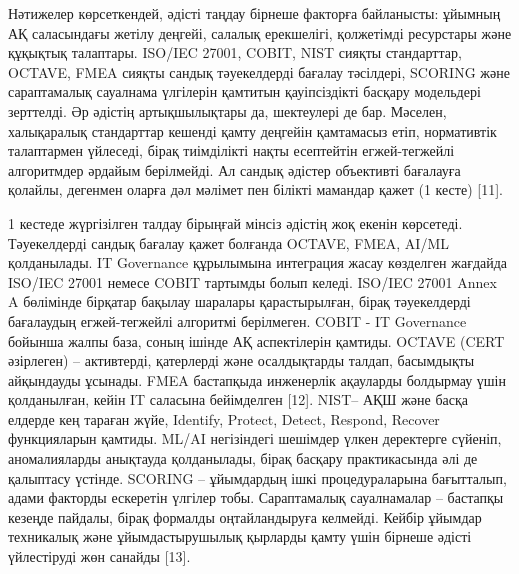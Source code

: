 \begin{multicols}{2}
Нәтижелер көрсеткендей, әдісті таңдау бірнеше факторға байланысты:
ұйымның АҚ саласындағы жетілу деңгейі, салалық ерекшелігі, қолжетімді
ресурстары және құқықтық талаптары. ISO/IEC 27001, COBIT, NIST сияқты
стандарттар, OCTAVE, FMEA сияқты сандық тәуекелдерді бағалау тәсілдері,
SCORING және сараптамалық сауалнама үлгілерін қамтитын қауіпсіздікті
басқару модельдері зерттелді. Әр әдістің артықшылықтары да, шектеулері
де бар. Мәселен, халықаралық стандарттар кешенді қамту деңгейін
қамтамасыз етіп, нормативтік талаптармен үйлеседі, бірақ тиімділікті
нақты есептейтін егжей-тегжейлі алгоритмдер әрдайым берілмейді. Ал
сандық әдістер объективті бағалауға қолайлы, дегенмен оларға дәл мәлімет
пен білікті мамандар қажет (1 кесте) {[}11{]}.

1 кестеде жүргізілген талдау бірыңғай мінсіз әдістің жоқ екенін
көрсетеді. Тәуекелдерді сандық бағалау қажет болғанда OCTAVE, FMEA,
AI/ML қолданылады. IT Governance құрылымына интеграция жасау көзделген
жағдайда ISO/IEC 27001 немесе COBIT тартымды болып келеді. ISO/IEC 27001
Annex A бөлімінде бірқатар бақылау шаралары қарастырылған, бірақ
тәуекелдерді бағалаудың егжей-тегжейлі алгоритмі берілмеген. COBIT - IT
Governance бойынша жалпы база, соның ішінде АҚ аспектілерін қамтиды.
OCTAVE (CERT әзірлеген) -- активтерді, қатерлерді және осалдықтарды
талдап, басымдықты айқындауды ұсынады. FMEA бастапқыда инженерлік
ақауларды болдырмау үшін қолданылған, кейін IT саласына бейімделген
{[}12{]}. NIST-- АҚШ және басқа елдерде кең тараған жүйе, Identify,
Protect, Detect, Respond, Recover функцияларын қамтиды. ML/AI
негізіндегі шешімдер үлкен деректерге сүйеніп, аномалияларды анықтауда
қолданылады, бірақ басқару практикасында әлі де қалыптасу үстінде.
SCORING -- ұйымдардың ішкі процедураларына бағытталып, адами факторды
ескеретін үлгілер тобы. Сараптамалық сауалнамалар -- бастапқы кезеңде
пайдалы, бірақ формалды оңтайландыруға келмейді. Кейбір ұйымдар
техникалық және ұйымдастырушылық қырларды қамту үшін бірнеше әдісті
үйлестіруді жөн санайды {[}13{]}.

\end{multicols}

